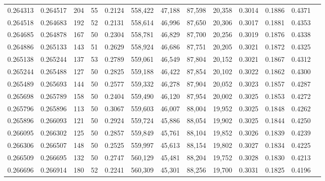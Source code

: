 \begin{tabular}{rrrrrrrrrrrrr}
0.264313 & 0.264517 &   204 &  55 &                                     0.2124 & 558,422 &  47,188 &  87,598 &  20,358 & 0.3014 & 0.1886 & 0.4371 \\
0.264518 & 0.264683 &   192 &  52 &                                     0.2131 & 558,614 &  46,996 &  87,650 &  20,306 & 0.3017 & 0.1881 & 0.4353 \\
0.264685 & 0.264878 &   167 &  50 &                                     0.2304 & 558,781 &  46,829 &  87,700 &  20,256 & 0.3019 & 0.1876 & 0.4338 \\
0.264886 & 0.265133 &   143 &  51 &                                     0.2629 & 558,924 &  46,686 &  87,751 &  20,205 & 0.3021 & 0.1872 & 0.4325 \\
0.265138 & 0.265244 &   137 &  53 &                                     0.2789 & 559,061 &  46,549 &  87,804 &  20,152 & 0.3021 & 0.1867 & 0.4312 \\
0.265244 & 0.265488 &   127 &  50 &                                     0.2825 & 559,188 &  46,422 &  87,854 &  20,102 & 0.3022 & 0.1862 & 0.4300 \\
0.265489 & 0.265693 &   144 &  50 &                                     0.2577 & 559,332 &  46,278 &  87,904 &  20,052 & 0.3023 & 0.1857 & 0.4287 \\
0.265698 & 0.265789 &   158 &  50 &                                     0.2404 & 559,490 &  46,120 &  87,954 &  20,002 & 0.3025 & 0.1853 & 0.4272 \\
0.265796 & 0.265896 &   113 &  50 &                                     0.3067 & 559,603 &  46,007 &  88,004 &  19,952 & 0.3025 & 0.1848 & 0.4262 \\
0.265896 & 0.266093 &   121 &  50 &                                     0.2924 & 559,724 &  45,886 &  88,054 &  19,902 & 0.3025 & 0.1844 & 0.4250 \\
0.266095 & 0.266302 &   125 &  50 &                                     0.2857 & 559,849 &  45,761 &  88,104 &  19,852 & 0.3026 & 0.1839 & 0.4239 \\
0.266306 & 0.266507 &   148 &  50 &                                     0.2525 & 559,997 &  45,613 &  88,154 &  19,802 & 0.3027 & 0.1834 & 0.4225 \\
0.266509 & 0.266695 &   132 &  50 &                                     0.2747 & 560,129 &  45,481 &  88,204 &  19,752 & 0.3028 & 0.1830 & 0.4213 \\
0.266696 & 0.266914 &   180 &  52 &                                     0.2241 & 560,309 &  45,301 &  88,256 &  19,700 & 0.3031 & 0.1825 & 0.4196 \\

\end{tabular}
